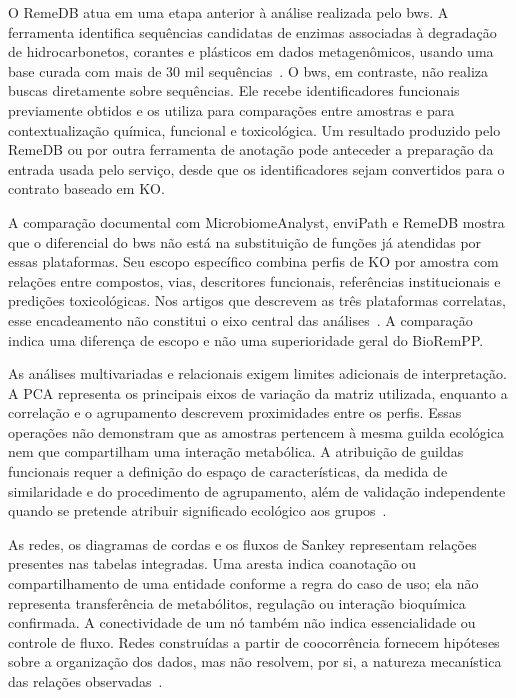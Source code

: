 O RemeDB atua em uma etapa anterior à análise realizada pelo \gls{bws}. A
ferramenta identifica sequências candidatas de enzimas associadas à degradação
de hidrocarbonetos, corantes e plásticos em dados metagenômicos, usando uma
base curada com mais de 30 mil sequências~\cite{subramanian2020remedb}. O
\gls{bws}, em contraste, não realiza buscas diretamente sobre sequências. Ele
recebe identificadores funcionais previamente obtidos e os utiliza para
comparações entre amostras e para contextualização química, funcional e
toxicológica. Um resultado produzido pelo RemeDB ou por outra ferramenta de
anotação pode anteceder a preparação da entrada usada pelo serviço, desde que
os identificadores sejam convertidos para o contrato baseado em KO.

A comparação documental com MicrobiomeAnalyst, enviPath e RemeDB mostra que o
diferencial do \gls{bws} não está na substituição de funções já atendidas por
essas plataformas. Seu escopo específico combina perfis de KO por amostra com
relações entre compostos, vias, descritores funcionais, referências
institucionais e predições toxicológicas. Nos artigos que descrevem as três
plataformas correlatas, esse encadeamento não constitui o eixo central das
análises~\cite{lu2023microbiomeanalyst,wicker2016envipath,subramanian2020remedb}.
A comparação indica uma diferença de escopo e não uma superioridade geral do
BioRemPP.

As análises multivariadas e relacionais exigem limites adicionais de
interpretação. A PCA representa os principais eixos de variação da matriz
utilizada, enquanto a correlação e o agrupamento descrevem proximidades entre
os perfis. Essas operações não demonstram que as amostras pertencem à mesma
guilda ecológica nem que compartilham uma interação metabólica. A atribuição
de guildas funcionais requer a definição do espaço de características, da
medida de similaridade e do procedimento de agrupamento, além de validação
independente quando se pretende atribuir significado ecológico aos
grupos~\cite{reynolds2023}.

As redes, os diagramas de cordas e os fluxos de Sankey representam relações
presentes nas tabelas integradas. Uma aresta indica coanotação ou
compartilhamento de uma entidade conforme a regra do caso de uso; ela não
representa transferência de metabólitos, regulação ou interação bioquímica
confirmada. A conectividade de um nó também não indica essencialidade ou
controle de fluxo. Redes construídas a partir de coocorrência fornecem
hipóteses sobre a organização dos dados, mas não resolvem, por si, a natureza
mecanística das relações observadas~\cite{faust2012cooccurrence}.

